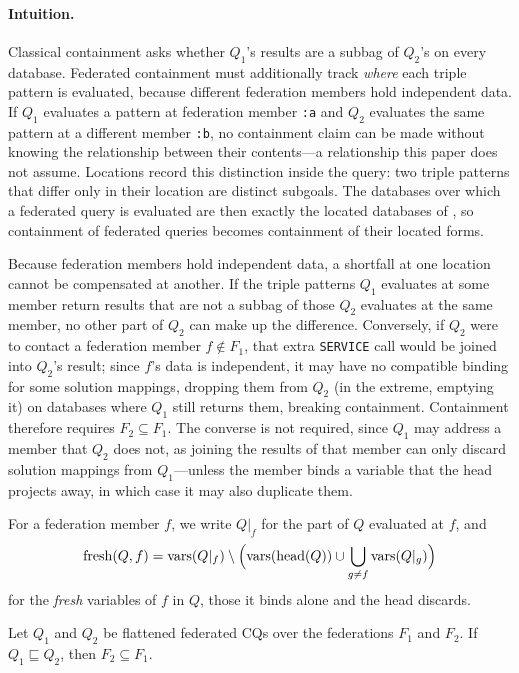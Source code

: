 \documentclass[../main]{subfiles}
\begin{document}
\paragraph{Intuition.}
Classical containment asks whether $Q_1$'s results are a subbag of $Q_2$'s on every database.
Federated containment must additionally track \emph{where} each triple pattern is evaluated, because different federation members hold independent data.
If $Q_1$ evaluates a pattern at federation member \texttt{:a} and $Q_2$ evaluates the same pattern at a different member \texttt{:b}, no containment claim can be made without knowing the relationship between their contents---a relationship this paper does not assume.
Locations record this distinction inside the query: two triple patterns that differ only in their location are distinct subgoals.
The databases over which a federated query is evaluated are then exactly the located databases of , so containment of federated queries becomes containment of their located forms.

Because federation members hold independent data, a shortfall at one location cannot be compensated at another.
If the triple patterns $Q_1$ evaluates at some member return results that are not a subbag of those $Q_2$ evaluates at the same member, no other part of $Q_2$ can make up the difference.
Conversely, if $Q_2$ were to contact a federation member $f \notin F_1$, that extra \texttt{SERVICE} call would be joined into $Q_2$'s result; since $f$'s data is independent, it may have no compatible binding for some solution mappings, dropping them from $Q_2$ (in the extreme, emptying it) on databases where $Q_1$ still returns them, breaking containment.
Containment therefore requires $F_2 \subseteq F_1$.
The converse is not required, since $Q_1$ may address a member that $Q_2$ does not, as joining the results of that member can only discard solution mappings from $Q_1$---unless the member binds a variable that the head projects away, in which case it may also duplicate them.

For a federation member $f$, we write $Q|_f$ for the part of $Q$ evaluated at $f$, and
\[
  \operatorname{fresh}(Q, f) = \operatorname{vars}(Q|_f) \setminus \Bigl( \operatorname{vars}(\operatorname{head}(Q)) \cup \bigcup_{g \neq f} \operatorname{vars}(Q|_g) \Bigr)
\]
for the \emph{fresh} variables of $f$ in $Q$, those it binds alone and the head discards.

\begin{proposition}\label{prop_fed_subset}
  Let $Q_1$ and $Q_2$ be flattened federated \acp{CQ} over the federations $F_1$ and $F_2$.
  If $Q_1 \sqsubseteq Q_2$, then $F_2 \subseteq F_1$.
\end{proposition}
\end{document}
